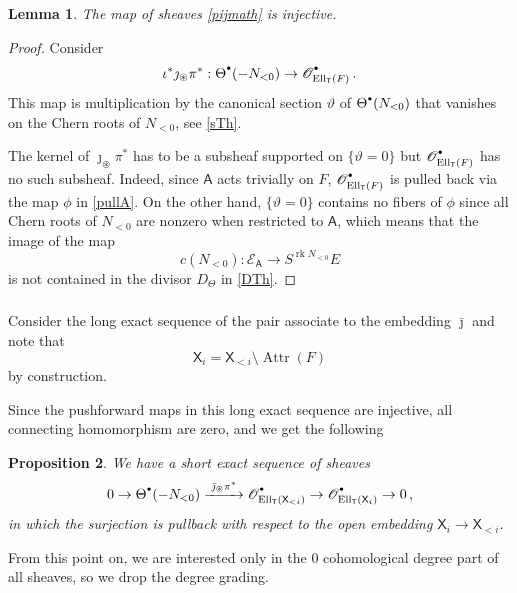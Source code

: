 \documentclass[14pt]{extarticle}
\newcommand{\Thetad}{{\Theta}^{\raisebox{0.5mm}{$\scriptscriptstyle \bullet$}}}
\newcommand{\cOd}{{\cO}^{\raisebox{0.5mm}{$\scriptscriptstyle \bullet$}}}
\newcommand{\bT}{\mathsf{T}}
\newcommand{\bA}{\mathsf{A}}
\newcommand{\bX}{\mathsf{X}}
\newcommand{\cE}{\mathscr{E}}
\newcommand{\vth}{\vartheta}
\newcommand{\cO}{\mathscr{O}}
\newcommand{\ppf}{{\circledast}}
\newcommand{\pf}{_{\ppf}}
\newcommand{\jb}{\bar \jmath}
\DeclareMathOperator{\Ell}{Ell}
\DeclareMathOperator{\rk}{rk}
\DeclareMathOperator{\sAttr}{Attr}
\newtheorem{Lemma}{Lemma}[section]
\newtheorem{Proposition}[Lemma]{Proposition}
\theoremstyle{definition}
\begin{document}
\subsubsection{}



\begin{Lemma}
The map of sheaves \eqref{pijmath} is injective. 
\end{Lemma}

\begin{proof}
Consider 
$$
\iota^* \jmath\pf \pi^*:  \Thetad(-N_{<0}) \to  \cOd_{\Ell_\bT(F)} \,. 
$$
This map is multiplication by the canonical section $\vth$ of
$\Thetad(N_{<0})$ that vanishes on the Chern roots of $N_{<0}$,
see \eqref{sTh}. 

The kernel of $\jmath\pf \pi^*$ has to be a subsheaf supported on 
$\{\vth=0\}$ 
but $\cOd_{\Ell_\bT(F)}$ has no such subsheaf. Indeed, since
$\bA$ acts trivially on $F$, $\cOd_{\Ell_\bT(F)}$ is pulled back
via the map $\phi$ in \eqref{pullA}.
On the other hand, $\{\vth=0\}$ contains no fibers of $\phi$ 
since all Chern roots of $N_{<0}$ are
nonzero when restricted to $\bA$, which means that the image of the
map 
$$
c(N_{<0}) : \cE_\bA \to S^{\rk N_{<0}} E
$$
is not contained in the divisor $D_\Theta$ in \eqref{DTh}. 
\end{proof}

\subsubsection{}
Consider the long exact sequence of the pair associate to the
embedding $\jb$ and note that
$$
\bX_i = \bX_{<i} \setminus \sAttr(F)
$$
by construction. 

Since the pushforward maps in this
long
exact sequence are injective, all connecting homomorphism are zero,
and we get the following

\begin{Proposition}
  We have a short exact sequence of sheaves
  \begin{equation}
    \label{shortexact}
    0 \to \Thetad(-N_{<0}) \xrightarrow{\,\, \jb \pf \pi^*\,}
    \cOd_{\Ell_\bT(\bX_{<i})} \to   \cOd_{\Ell_\bT(\bX_i)} \to 0  \,, 
  \end{equation}
  in which the surjection is pullback with respect to the open
  embedding
  $\bX_i \to \bX_{<i}$. 
\end{Proposition}

{} From this point on, we are interested only in the 0 cohomological
degree part of all sheaves, so we drop the degree grading. 
\end{document}
